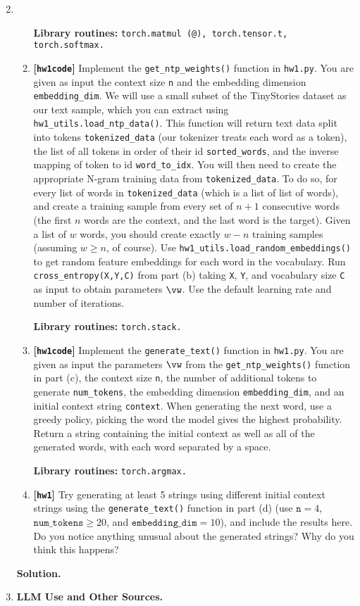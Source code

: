\documentclass{article}
\def\hw{\textbf{[\texttt{hw1}]}\xspace}
\def\hwcode{\textbf{[\texttt{hw1code}]}\xspace}
\theoremstyle{definition}
\theoremstyle{remark}
\newenvironment{Q}
{%
  \clearpage
  \item
  }
  {%
    \phantom{s} %
    \bigskip
    \textbf{Solution.}
  }
\begin{document}
\begin{enumerate}[font={\Large\bfseries},left=0pt]
\begin{Q}
\begin{enumerate}
    \textbf{Library routines:} \texttt{torch.matmul (@), torch.tensor.t, torch.softmax.}
    
    \item \hwcode Implement the \texttt{get\_ntp\_weights()} function in \texttt{hw1.py}.
    You are given as input the context size \texttt{n} and the embedding dimension \texttt{embedding\_dim}.
    We will use a small subset of the TinyStories dataset \cite{tinystories} as our text sample,
    which you can extract using \texttt{hw1\_utils.load\_ntp\_data()}.
    This function will return text data split into tokens \texttt{tokenized\_data}
    (our tokenizer treats each word as a token),
    the list of all tokens in order of their id \texttt{sorted\_words},
    and the inverse mapping of token to id \texttt{word\_to\_idx}.
    You will then need to create the appropriate N-gram training data from \texttt{tokenized\_data}.
    To do so, for every list of words in \texttt{tokenized\_data} (which is a list of list of words),
    and create a training sample from every set of $n+1$ consecutive words (the first $n$ words are the context, and the last word is the target).
    Given a list of $w$ words, you should create exactly $w-n$ training samples (assuming $w \geq n$, of course).
    Use \texttt{hw1\_utils.load\_random\_embeddings()} to get random feature embeddings for each word in the vocabulary.
    Run \texttt{cross\_entropy(X,Y,C)} from part (b) taking \texttt{X}, \texttt{Y}, and vocabulary size \texttt{C} as input to obtain parameters $\vw$.
    Use the default learning rate and number of iterations.
    
    \textbf{Library routines:} \texttt{torch.stack.}

    \item \hwcode Implement the \texttt{generate\_text()} function in \texttt{hw1.py}.
    You are given as input the parameters $\vw$ from the \texttt{get\_ntp\_weights()} function in part (c),
    the context size \texttt{n}, the number of additional tokens to generate \texttt{num\_tokens},
    the embedding dimension \texttt{embedding\_dim}, and an initial context string \texttt{context}.
    When generating the next word, use a greedy policy, picking the word the model gives the highest probability.
    Return a string containing the initial context as well as all of the generated words, with each word separated by a space.
    
    \textbf{Library routines:} \texttt{torch.argmax.}
    
    \item \hw Try generating at least 5 strings using different initial context strings
    using the \texttt{generate\_text()} function in part (d) (use $\texttt{n}=4$, $\texttt{num\_tokens} \geq 20$, and $\texttt{embedding\_dim}=10$),
    and include the results here. Do you notice anything unusual about the generated strings? Why do you think this happens?
    \end{enumerate}
    \end{Q}
    \clearpage
    \item \textbf{\Large LLM Use and Other Sources.}
    

\end{enumerate}
\end{document}
